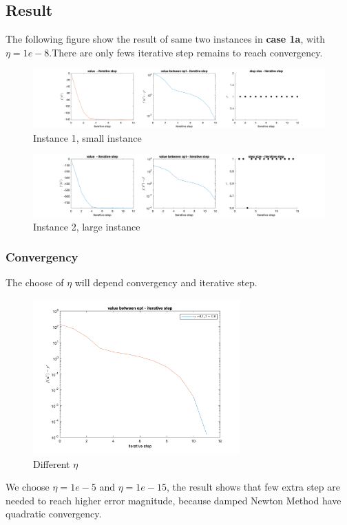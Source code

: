 \documentclass[]{article}
\begin{document}
\subsection{Result}
The following figure show the result of same two instances in \textbf{case 1a}, with $\eta = 1e-8$.There are only fews iterative step remains to reach convergency.
\begin{figure}[H]
	\centering
	\includegraphics[width=350pt,keepaspectratio]{dnt_small_normal}
	\caption{Instance 1, small instance}
\end{figure}

\begin{figure}[H]
	\centering
	\includegraphics[width=350pt,keepaspectratio]{dnt_large_normal}
	\caption{Instance 2, large instance}
\end{figure}
\subsubsection{Convergency}
The choose of $\eta$ will depend convergency and iterative step.
\begin{figure}[H]
	\centering
	\includegraphics[width=225pt,keepaspectratio]{N}
	\caption{Different $\eta$}
\end{figure}
\par We choose $\eta = 1e-5 $ and $\eta=1e-15$, the result shows that  few extra step are needed to reach higher  error magnitude, because damped Newton Method have quadratic convergency.
\end{document}
